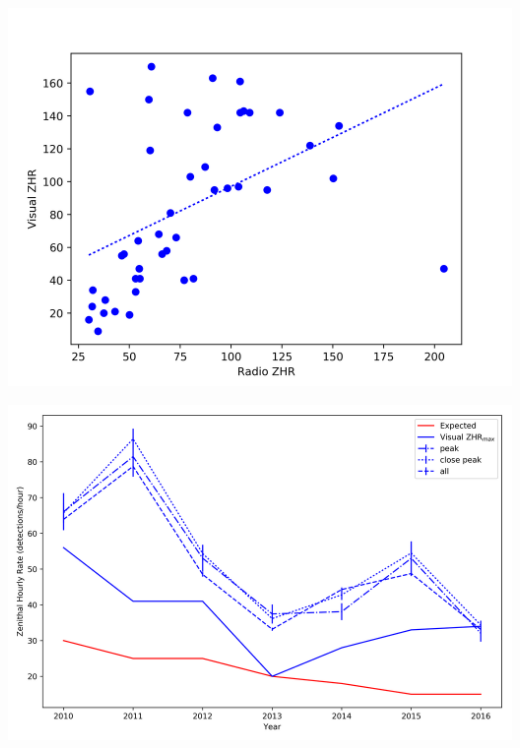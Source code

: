 \documentclass{beamer}
\begin{document}
	\begin{frame}
		\centering
		\includegraphics[width=\linewidth]{peak_scatter}
	\end{frame}

	\begin{frame}
		\centering
		\includegraphics[width=\linewidth]{orionids_notitle}
	\end{frame}
	
\end{document}
